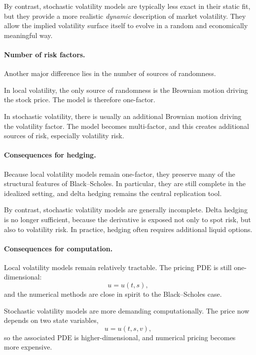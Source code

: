 \documentclass[11pt]{article}
\theoremstyle{plain}
\theoremstyle{definition}
\theoremstyle{remark}
\begin{document}
By contrast, stochastic volatility models are typically less exact in
their static fit, but they provide a more realistic \emph{dynamic}
description of market volatility.
They allow the implied volatility surface itself to evolve in a random
and economically meaningful way.

\paragraph{Number of risk factors.}

Another major difference lies in the number of sources of randomness.

In local volatility, the only source of randomness is the Brownian
motion driving the stock price.
The model is therefore one-factor.

In stochastic volatility, there is usually an additional Brownian motion
driving the volatility factor.
The model becomes multi-factor, and this creates additional sources of
risk, especially volatility risk.

\paragraph{Consequences for hedging.}

Because local volatility models remain one-factor, they preserve many of
the structural features of Black--Scholes.
In particular, they are still complete in the idealized setting, and
delta hedging remains the central replication tool.

By contrast, stochastic volatility models are generally incomplete.
Delta hedging is no longer sufficient, because the derivative is exposed
not only to spot risk, but also to volatility risk.
In practice, hedging often requires additional liquid options.

\paragraph{Consequences for computation.}

Local volatility models remain relatively tractable.
The pricing PDE is still one-dimensional:
\[
u=u(t,s),
\]
and the numerical methods are close in spirit to the Black--Scholes
case.

Stochastic volatility models are more demanding computationally.
The price now depends on two state variables,
\[
u=u(t,s,v),
\]
so the associated PDE is higher-dimensional, and numerical pricing
becomes more expensive.
\end{document}
